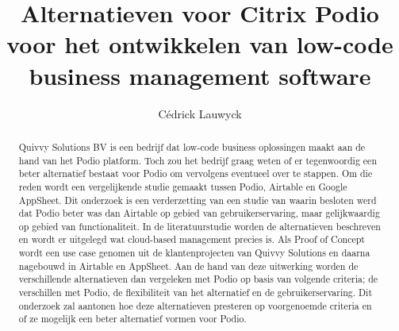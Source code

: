 \documentclass{hogent-article}
\title{Alternatieven voor Citrix Podio voor het ontwikkelen van low-code business management software}
\author{Cédrick Lauwyck}
\begin{document}
\begin{abstract}
    
 Quivvy Solutions BV is een bedrijf dat low-code business oplossingen maakt aan de hand van het Podio platform. Toch zou het bedrijf graag weten of er tegenwoordig een beter alternatief bestaat voor Podio om vervolgens eventueel over te stappen. Om die reden wordt een vergelijkende studie gemaakt tussen Podio, Airtable en Google AppSheet. Dit onderzoek is een verderzetting van een studie van \textcite{Spitaels2022} waarin besloten werd dat Podio beter was dan Airtable op gebied van gebruikerservaring, maar gelijkwaardig op gebied van functionaliteit. In de literatuurstudie worden de alternatieven beschreven en wordt er uitgelegd wat cloud-based management precies is. Als Proof of Concept wordt een use case genomen uit de klantenprojecten van Quivvy Solutions en daarna nagebouwd in Airtable en AppSheet. Aan de hand van deze uitwerking worden de verschillende alternatieven dan vergeleken met Podio op basis van volgende criteria; de verschillen met Podio, de flexibiliteit van het alternatief en de gebruikerservaring. Dit onderzoek zal aantonen hoe deze alternatieven presteren op voorgenoemde criteria en of ze mogelijk een beter alternatief vormen voor Podio.
\end{abstract}

\tableofcontents



\printbibliography[heading=bibintoc]
\end{document}
